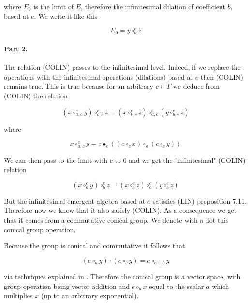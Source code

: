 \documentclass{article}
\begin{document}
where $E_{0}$ is the limit of $E$, therefore the infinitesimal dilation of coefficient $b$, based at $e$. We write it like this 



$$ E_{0} = y \circ_{b}^{e} z$$ 



\paragraph{Part 2.} The relation (COLIN) passes to the infinitesimal level. Indeed, if we replace the operations with the infinitesimal operations (dilations) based at $e$ then (COLIN) remains true.  This is true because  for an arbitrary $c \in \Gamma$ we deduce from (COLIN) the relation 



 $$ (x \circ_{a,c}^{e} y) \circ_{b,c}^{e} z = (x \circ_{b,c}^{e} z) \circ_{a,c}^{e} (y \circ_{b,c}^{e} z)$$



where 



$$ x \circ_{a,c}^{e} y = e \bullet_{c} ((e \circ_{c} x) \circ_{a} (e \circ_{c} y))$$



We can then pass to the limit with $c$ to $0$ and we get the "infinitesimal" (COLIN) relation 



$$ (x \circ_{a}^{e} y) \circ_{b} ^{e}z = (x \circ_{b}^{e}z) \circ_{a}^{e} (y \circ_{b}^{e} z)$$



But the infinitesimal emergent algebra based at $e$ satisfies (LIN) \cite{buligainf} proposition 7.11. Therefore now we know that it also satisfy (COLIN). As a consequence we get that it comes from a commutative conical group. We denote with a dot this conical group operation. 



Because the group is conical and commutative it follows that 



$$ (e \circ_{a} y) \cdot (e \circ_{b} y)  = e \circ_{a + b} y$$



via techniques explained in \cite{buligaem}. Therefore the conical group is a vector space, with group operation being vector addition and $e \circ_{a} x$ equal to the  scalar $a$ which multiplies $x$ (up to an arbitrary exponential). 
\end{document}
